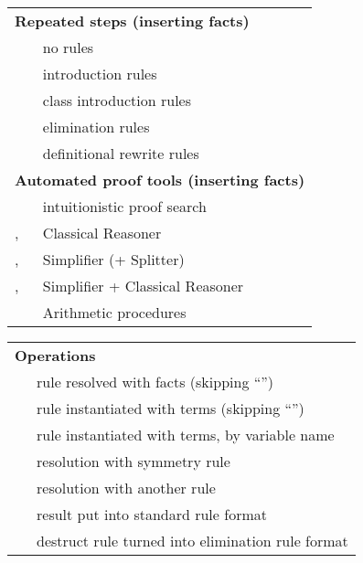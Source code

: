 \begin{isabellebody}
\begin{isamarkuptext}
\begin{tabular}{ll}
    \multicolumn{2}{l}{\textbf{Repeated steps (inserting facts)}} \\[0.5ex]
    \mbox{\isa{{\isacharminus}}} & no rules \\
    \mbox{\isa{intro}}~\isa{a} & introduction rules \\
    \mbox{\isa{intro{\isacharunderscore}classes}} & class introduction rules \\
    \mbox{\isa{elim}}~\isa{a} & elimination rules \\
    \mbox{\isa{unfold}}~\isa{a} & definitional rewrite rules \\[2ex]

    \multicolumn{2}{l}{\textbf{Automated proof tools (inserting facts)}} \\[0.5ex]
    \mbox{\isa{iprover}} & intuitionistic proof search \\
    \mbox{\isa{blast}}, \mbox{\isa{fast}} & Classical Reasoner \\
    \mbox{\isa{simp}}, \mbox{\isa{simp{\isacharunderscore}all}} & Simplifier (+ Splitter) \\
    \mbox{\isa{auto}}, \mbox{\isa{force}} & Simplifier + Classical Reasoner \\
    \mbox{\isa{arith}} & Arithmetic procedures \\
  \end{tabular}%
\end{isamarkuptext}%
\isamarkuptrue%
%
\isamarkuptrue%
%
\begin{isamarkuptext}%
\begin{tabular}{ll}
    \multicolumn{2}{l}{\textbf{Operations}} \\[0.5ex]
    \mbox{\isa{OF}}~\isa{a} & rule resolved with facts (skipping ``\isa{{\isacharunderscore}}'') \\
    \mbox{\isa{of}}~\isa{t} & rule instantiated with terms (skipping ``\isa{{\isacharunderscore}}'') \\
    \mbox{\isa{where}}~\isa{x\ {\isacharequal}\ t} & rule instantiated with terms, by variable name \\
    \mbox{\isa{symmetric}} & resolution with symmetry rule \\
    \mbox{\isa{THEN}}~\isa{b} & resolution with another rule \\
    \mbox{\isa{rule{\isacharunderscore}format}} & result put into standard rule format \\
    \mbox{\isa{elim{\isacharunderscore}format}} & destruct rule turned into elimination rule format \\[1ex]


\end{tabular}
\end{isamarkuptext}
\end{isabellebody}
